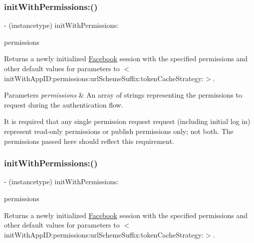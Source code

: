 \subsubsection{\texorpdfstring{init\+With\+Permissions\+:()}{initWithPermissions:()}\hspace{0.1cm}{\footnotesize\ttfamily [1/5]}}
{\footnotesize\ttfamily -\/ (instancetype) init\+With\+Permissions\+: \begin{DoxyParamCaption}\item[{(N\+S\+Array $\ast$)}]{permissions }\end{DoxyParamCaption}}

Returns a newly initialized \hyperlink{interfaceFacebook}{Facebook} session with the specified permissions and other default values for parameters to $<$init\+With\+App\+I\+D\+:permissions\+:url\+Scheme\+Suffix\+:token\+Cache\+Strategy\+:$>$.


\begin{DoxyParams}{Parameters}
{\em permissions} & An array of strings representing the permissions to request during the authentication flow.\\
\hline
\end{DoxyParams}
It is required that any single permission request request (including initial log in) represent read-\/only permissions or publish permissions only; not both. The permissions passed here should reflect this requirement. \mbox{\label{interfaceFBSession_a3f8419d590fb8f950aa9aee7110fb5e6}} 
\subsubsection{\texorpdfstring{init\+With\+Permissions\+:()}{initWithPermissions:()}\hspace{0.1cm}{\footnotesize\ttfamily [2/5]}}
{\footnotesize\ttfamily -\/ (instancetype) init\+With\+Permissions\+: \begin{DoxyParamCaption}\item[{(N\+S\+Array $\ast$)}]{permissions }\end{DoxyParamCaption}}

Returns a newly initialized \hyperlink{interfaceFacebook}{Facebook} session with the specified permissions and other default values for parameters to $<$init\+With\+App\+I\+D\+:permissions\+:url\+Scheme\+Suffix\+:token\+Cache\+Strategy\+:$>$.


